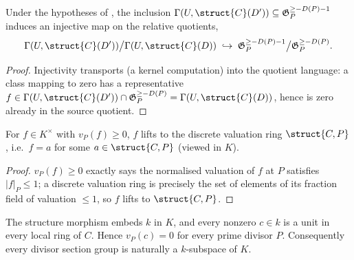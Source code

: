 \begin{theorem}
  \label{thm:adelic_local_step_injective}
  \leanok
  Under the hypotheses of , the
  inclusion \(\Gamma(U, \struct{C}(D')) \subseteq \mathfrak G_P^{\ge
  -D(P)-1}\) induces an injective map on the relative quotients,
  \[
    \Gamma(U, \struct{C}(D')) \big/ \Gamma(U, \struct{C}(D))
      \;\hookrightarrow\;
      \mathfrak G_P^{\ge -D(P)-1} \big/ \mathfrak G_P^{\ge -D(P)}.
  \]
\end{theorem}
\begin{proof}
  \leanok
  Injectivity transports  (a
  kernel computation) into the quotient language: a class mapping to
  zero has a representative \(f \in \Gamma(U, \struct{C}(D')) \cap
  \mathfrak G_P^{\ge -D(P)} = \Gamma(U, \struct{C}(D))\), hence is zero
  already in the source quotient.
\end{proof}

\begin{lemma}
  \label{lem:adelic_order_stalk_integral}
  \leanok
  For \(f \in K^\times\) with \(v_P(f) \ge 0\), \(f\) lifts to the
  discrete valuation ring \(\struct{C, P}\), i.e.\ \(f = a\) for some
  \(a \in \struct{C, P}\) (viewed in \(K\)).
\end{lemma}
\begin{proof}
  \leanok
  \(v_P(f) \ge 0\) exactly says the normalised valuation of \(f\) at
  \(P\) satisfies \(|f|_P \le 1\); a discrete valuation ring is
  precisely the set of elements of its fraction field of valuation
  \(\le 1\), so \(f\) lifts to \(\struct{C, P}\).
\end{proof}

\begin{theorem}
  \label{thm:adelic_constant_field_order_zero}
  \leanok
  The structure morphism embeds \(k\) in \(K\), and every nonzero
  \(c\in k\) is a unit in every local ring of \(C\).  Hence
  \(v_P(c)=0\) for every prime divisor \(P\).  Consequently every divisor
  section group is naturally a \(k\)-subspace of \(K\).
\end{theorem}

